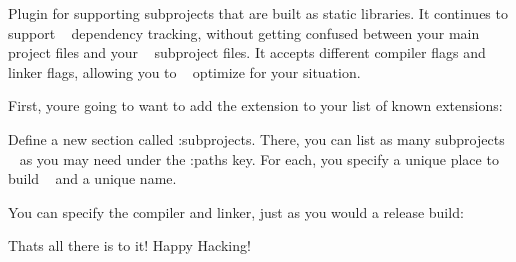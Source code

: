 Plugin for supporting subprojects that are built as static libraries. It continues to support ~\newline
 dependency tracking, without getting confused between your main project files and your ~\newline
 subproject files. It accepts different compiler flags and linker flags, allowing you to ~\newline
 optimize for your situation.

First, you\textquotesingle{}re going to want to add the extension to your list of known extensions\+:


\begin{DoxyCode}{0}

\end{DoxyCode}


Define a new section called \+:subprojects. There, you can list as many subprojects ~\newline
 as you may need under the \+:paths key. For each, you specify a unique place to build ~\newline
 and a unique name.


\begin{DoxyCode}{0}

\end{DoxyCode}


You can specify the compiler and linker, just as you would a release build\+:


\begin{DoxyCode}{0}

\end{DoxyCode}


That\textquotesingle{}s all there is to it! Happy Hacking! 